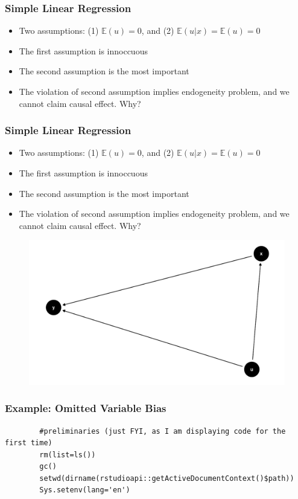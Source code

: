 \documentclass{beamer}
\begin{document}
\begin{frame}
	\frametitle{Simple Linear Regression}
	\begin{itemize}
		\item Two assumptions: (1) $\mathbb E(u) = 0$, and (2) $\mathbb E(u|x) = \mathbb E(u) = 0$
		\item The first assumption is innoccuous
		\item The second assumption is the most important
		\item The violation of second assumption implies endogeneity problem, and we cannot claim causal effect. Why?
	\end{itemize}
	
\end{frame}


\begin{frame}
	\frametitle{Simple Linear Regression}
	\begin{itemize}
		\item Two assumptions: (1) $\mathbb E(u) = 0$, and (2) $\mathbb E(u|x) = \mathbb E(u) = 0$
		\item The first assumption is innoccuous
		\item The second assumption is the most important
		\item The violation of second assumption implies endogeneity problem, and we cannot claim causal effect. Why?
	\end{itemize}
	\begin{figure}
		\centering
		\includegraphics[scale=0.35]{figures/dag_simple_regression.pdf}
	\end{figure}
\end{frame}


\begin{frame}[fragile]
	\frametitle{Example: Omitted Variable Bias}
	\begin{lstlisting}
		#preliminaries (just FYI, as I am displaying code for the first time)
		rm(list=ls())
		gc()
		setwd(dirname(rstudioapi::getActiveDocumentContext()$path))
		Sys.setenv(lang='en')
	\end{lstlisting}
	
\end{frame}
\end{document}
